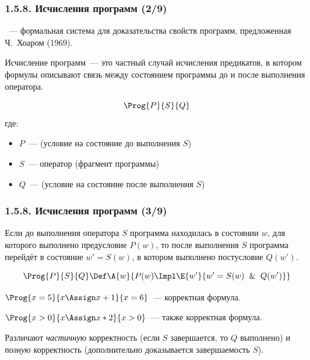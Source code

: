\begin{frame}
\frametitle{1.5.8. Исчисления программ (2/9)}

~--- формальная система 
для доказательства свойств программ, предложенная Ч.~Хоаром (1969).

\begin{remark}
Исчисление программ~--- это частный случай исчисления предикатов, 
в котором формулы описывают связь между состоянием программы 
до и после выполнения оператора.
\end{remark}

\[
\Prog{P}{S}{Q}
\]
где:
\begin{itemize}
\item $P$~---  (условие на состояние до выполнения $S$)
\item $S$~--- оператор (фрагмент программы)
\item $Q$~---  (условие на состояние после выполнения $S$)
\end{itemize}

\end{frame}



\begin{frame}
\frametitle{1.5.8. Исчисления программ (3/9)}


Если до выполнения оператора $S$ программа находилась в состоянии $w$, 
для которого выполнено предусловие $P(w)$, то после выполнения $S$ 
программа перейдёт в состояние $w' = S(w)$, в котором выполнено постусловие $Q(w')$.

\[
\Prog{P}{S}{Q} \Def \A{w}{P(w) \Impl \E{w'}{w' = S(w) \And Q(w')}}
\]

\begin{example}
$\Prog{x = 5}{x \Assign x + 1}{x = 6}$~--- корректная формула.

$\Prog{x > 0}{x \Assign x * 2}{x > 0}$~--- также корректная формула.
\end{example}

\begin{remark}
Различают \emph{частичную} корректность (если $S$ завершается, то $Q$ выполнено) 
и \emph{полную} корректность (дополнительно доказывается завершаемость $S$).
\end{remark}

\end{frame}



